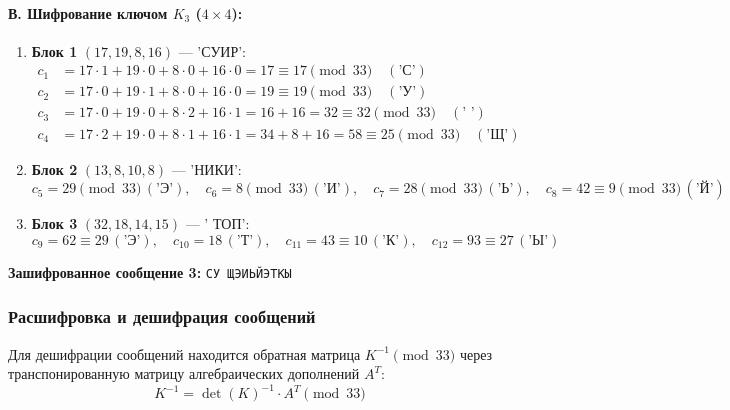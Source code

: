 \paragraph{В. Шифрование ключом $K_3$ ($4\times4$):}
\begin{enumerate}
    \item \textbf{Блок 1} $(17, 19, 8, 16)$ — 'СУИР':
    \[
    \begin{aligned}
        c_1 &= 17 \cdot 1 + 19 \cdot 0 + 8 \cdot 0 + 16 \cdot 0 = 17 \equiv 17 \pmod{33} \quad (\text{'С'}) \\
        c_2 &= 17 \cdot 0 + 19 \cdot 1 + 8 \cdot 0 + 16 \cdot 0 = 19 \equiv 19 \pmod{33} \quad (\text{'У'}) \\
        c_3 &= 17 \cdot 0 + 19 \cdot 0 + 8 \cdot 2 + 16 \cdot 1 = 16 + 16 = 32 \equiv 32 \pmod{33} \quad (\text{' '}) \\
        c_4 &= 17 \cdot 2 + 19 \cdot 0 + 8 \cdot 1 + 16 \cdot 1 = 34 + 8 + 16 = 58 \equiv 25 \pmod{33} \quad (\text{'Щ'})
    \end{aligned}
    \]
    \item \textbf{Блок 2} $(13, 8, 10, 8)$ — 'НИКИ':
    \[
    c_5 = 29 \pmod{33} \, (\text{'Э'}), \quad c_6 = 8 \pmod{33} \, (\text{'И'}), \quad c_7 = 28 \pmod{33} \, (\text{'Ь'}), \quad c_8 = 42 \equiv 9 \pmod{33} \, (\text{'Й'})
    \]
    \item \textbf{Блок 3} $(32, 18, 14, 15)$ — ' ТОП':
    \[
    c_9 = 62 \equiv 29 \, (\text{'Э'}), \quad c_{10} = 18 \, (\text{'Т'}), \quad c_{11} = 43 \equiv 10 \, (\text{'К'}), \quad c_{12} = 93 \equiv 27 \, (\text{'Ы'})
    \]
\end{enumerate}
\textbf{Зашифрованное сообщение 3:} \texttt{СУ ЩЭИЬЙЭТКЫ}

\subsubsection{Расшифровка и дешифрация сообщений}
Для дешифрации сообщений находится обратная матрица $K^{-1} \pmod{33}$ через транспонированную матрицу алгебраических дополнений $A^T$:
\[
K^{-1} = \det(K)^{-1} \cdot A^T \pmod{33}
\]

